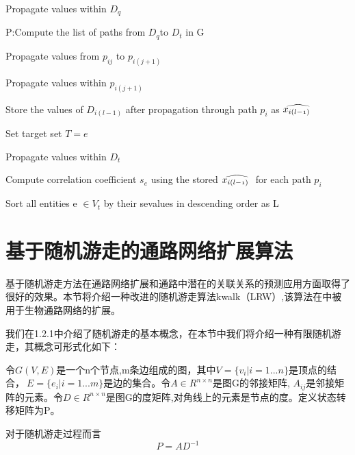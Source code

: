 \begin{algorithm}
%

Propagate values within $D_{q}$

P:Compute the list of paths from $D_{q}$to $D_{t}$ in G

{
	{
		Propagate values from $p_{ij}$ to $p_{i(j+1)}$
		
		Propagate values within $p_{i(j+1)}$
    }

    Store the values of $D_{i(l−1)}$ after propagation through path $p_{i}$ as $\mathnormal{\widehat{x_{i( l-1)} \ }}$
 }

{
	Set target set $T = {e}$

	Propagate values within $D_{t}$

	Compute correlation coefficient $s_{e}$ using the stored $ \mathnormal{\widehat{x_{i( l-1)} \ }}$ for each path $p_{i}$
}

Sort all entities e $\in V_{t}$ by their sevalues in descending order as L

\end{algorithm}
\section{基于随机游走的通路网络扩展算法}
基于随机游走方法在通路网络扩展和通路中潜在的关联关系的预测应用方面取得了很好的效果。本节将介绍一种改进的随机游走算法kwalk\cite{zhang2016limited}（LRW）,该算法在\cite{zhang2016network}中被用于生物通路网络的扩展。

我们在1.2.1中介绍了随机游走的基本概念，在本节中我们将介绍一种有限随机游走，其概念可形式化如下：

令$G(V,E)$是一个n个节点,m条边组成的图，其中$V=\{v_{i} |i=1...n\}$是顶点的结合，$\ E=\{e_{i} |i=1...m\}$是边的集合。令$A \in R^{n\times n}$是图G的邻接矩阵, $A_{ij}$是邻接矩阵的元素。令$D \in R^{n\times n}$是图G的度矩阵,对角线上的元素是节点的度。定义状态转移矩阵为P。

对于随机游走过程而言
\begin{equation}
	P = AD^{-1}
\end{equation}

